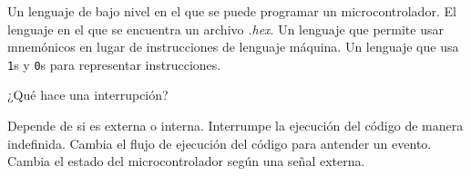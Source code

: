 \documentclass[10pt,letterpaper]{exam}
\begin{document}
\begin{questions}
    \begin{checkboxes}
        \choice Un lenguaje de bajo nivel en el que se puede programar un microcontrolador.
        \choice El lenguaje en el que se encuentra un archivo \textit{.hex}.
        \choice Un lenguaje que permite usar mnemónicos en lugar de instrucciones de lenguaje máquina.
        \choice Un lenguaje que usa \texttt{1}s y \texttt{0}s para representar instrucciones.
    \end{checkboxes}
    \question[10] ¿Qué hace una interrupción? 
    \begin{checkboxes}
        \choice Depende de si es externa o interna.
        \choice Interrumpe la ejecución del código de manera indefinida.
        \choice Cambia el flujo de ejecución del código para antender un evento.
        \choice Cambia el estado del microcontrolador según una señal externa.
    \end{checkboxes}
\end{questions}
\thispagestyle{empty}
\end{document}
